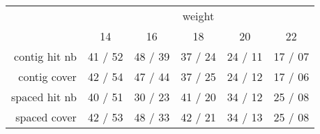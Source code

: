 \begin{tabular}{|r|c|c|c|c|c|}
\hline
& \multicolumn{5}{c|}{weight}\\
\cline{2-6}
                        & 14                  & 16                   & 18                   & 20                   & 22\\
\hline
  contig hit nb    & 41 / 52 & 48 / 39 & 37 / 24 & 24 / 11 & 17 / 07\\
  contig cover  & 42 / 54 & 47 / 44 & 37 / 25 & 24 / 12 & 17 / 06\\
\hline
  spaced hit nb    & 40 / 51 & 30 / 23 & 41 / 20 & 34 / 12 & 25 / 08\\
  spaced cover & 42 / 53 & 48 / 33 & 42 / 21 & 34 / 13 & 25 / 08\\
\hline
\end{tabular}
